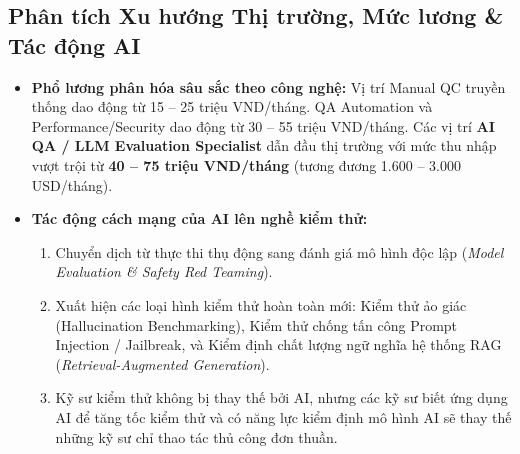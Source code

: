 \documentclass[11pt,a4paper]{article}
\begin{document}
\subsection{Phân tích Xu hướng Thị trường, Mức lương \& Tác động AI}
\begin{itemize}
    \item \textbf{Phổ lương phân hóa sâu sắc theo công nghệ:} Vị trí Manual QC truyền thống dao động từ 15 -- 25 triệu VND/tháng. QA Automation và Performance/Security dao động từ 30 -- 55 triệu VND/tháng. Các vị trí \textbf{AI QA / LLM Evaluation Specialist} dẫn đầu thị trường với mức thu nhập vượt trội từ \textbf{40 -- 75 triệu VND/tháng} (tương đương 1.600 -- 3.000 USD/tháng).
    \item \textbf{Tác động cách mạng của AI lên nghề kiểm thử:} 
    \begin{enumerate}
        \item Chuyển dịch từ thực thi thụ động sang đánh giá mô hình độc lập (\textit{Model Evaluation \& Safety Red Teaming}).
        \item Xuất hiện các loại hình kiểm thử hoàn toàn mới: Kiểm thử ảo giác (Hallucination Benchmarking), Kiểm thử chống tấn công Prompt Injection / Jailbreak, và Kiểm định chất lượng ngữ nghĩa hệ thống RAG (\textit{Retrieval-Augmented Generation}).
        \item Kỹ sư kiểm thử không bị thay thế bởi AI, nhưng các kỹ sư biết ứng dụng AI để tăng tốc kiểm thử và có năng lực kiểm định mô hình AI sẽ thay thế những kỹ sư chỉ thao tác thủ công đơn thuần.
    \end{enumerate}
\end{itemize}
\end{document}
